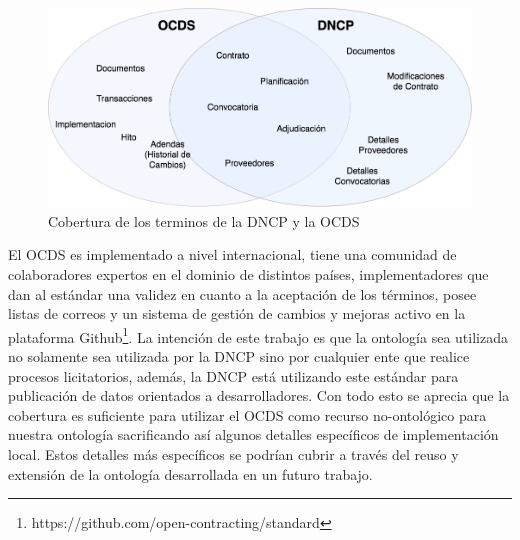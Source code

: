 \begin{figure}[ht!]
    \centering
    \includegraphics[width=150mm]{figuras/Diagramas-VennCobertura.png}
    \caption{Cobertura de los terminos de la DNCP y la OCDS}
    \label{img:coberturaontologia}
\end{figure}

    

El OCDS es implementado a nivel internacional, tiene una comunidad de colaboradores expertos en el dominio de distintos países, implementadores que dan al estándar una validez en cuanto a la aceptación de los términos, posee listas de correos y un sistema de gestión de cambios y mejoras activo en la plataforma Github\footnote{https://github.com/open-contracting/standard}. La intención de este trabajo es que la ontología sea utilizada no solamente sea utilizada por la DNCP sino por cualquier ente que realice procesos licitatorios, además, la DNCP está utilizando este estándar para publicación de datos orientados a desarrolladores. Con todo esto se aprecia que la cobertura es suficiente para utilizar el OCDS como recurso no-ontológico para nuestra ontología sacrificando así algunos detalles específicos de implementación local. Estos detalles más específicos se podrían cubrir a través del reuso y extensión de la ontología desarrollada en un futuro trabajo.
